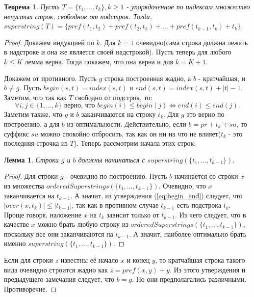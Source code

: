 \documentclass[a4paper,10pt]{article}
\newtheorem{theorem}{Теорема}
\newtheorem{lemma}{Лемма}
\begin{document}
\begin{theorem}
Пусть $T = \{t_1,\dots,t_k\}, k \geq 1$ - упорядоченное по индексам множество непустых строк, свободное от подстрок.
Тогда, $superstring(T) = \{ pref(t_1, t_2)+pref(t_2, t_3)+\dots+pref(t_{k-1}, t_k)+t_k\}$. 
\end{theorem}

\begin{proof}
Докажем индукцией по $k$.
Для $k = 1$ очевидно(сама строка должна лежать в надстроке и она же является своей надстрокой).
Пусть теперь для любого $k \leq K$ лемма верна. Тогда покажем, что она верна и для $k = K + 1$.

Докажем от противного. Пусть $g$ строка построенная жадно, а $b$ - кратчайшая, и $b \ne g$.
Пусть $begin(s, t) = index(s, t)$ и $end(s, t) = index(s, t) + |t| - 1$.
Заметим, что так как $T$ свободно от подстрок, то:
\begin{equation} \label{eq:begin_end}
	 \forall i,j \in \{ 1, \dots, k \} \mbox{ верно, что } begin(i) \leq begin(j) \iff end(i) \leq end(j).
\end{equation}
Заметим также, что $g$ и $b$ заканчиваются на строку $t_k$. Для $g$ это верно по построению, а для $b$ из оптимальности. 
Действительно, если $b = pr + t_k + su$, то суффикс $su$ можно спокойно отбросить, так как он ни на что не влияет($t_k$ - это последняя строчка из $T$).
Теперь рассмотрим начала этих строк:

\begin{lemma}
Строки $g$ и $b$ должны начинаться с $superstring(\{ t_1, \dots, t_{k-1} \})$.
\end{lemma}

\begin{proof}
Для строки $g$ - очевидно по построению.
Пусть $b$ начинается со строки $x$ из множества $orderedSuperstrings(\{ t_1, \dots, t_{k-1} \})$.
Очевидно, что $x$ заканчивается на $t_{k-1}$.
А значит, из утверждения (\ref{eq:begin_end}) следует, что $|over(x, t_k)| \leq |t_{k-1}|$, так как в противном случае $t_{k-1}$ есть подстрока $t_k$.
Проще говоря, наложение $x$ на $t_k$ зависит только от $t_{k-1}$.
Из чего следует, что в качестве $x$ можно брать любую строку из $orderedSuperstrings(\{ t_1, \dots, t_{k-1} \})$, поскольку все они заканчиваются на $t_{k-1}$.
А значит, наиболее оптимально брать именно $superstring(\{ t_1, \dots, t_{k-1} \})$.
\end{proof}

Если для строки $z$ известны её начало $x$ и конец $y$, то кратчайшая строка такого вида очевидно строится жадно как $z = pref(x, y) + y$.
Из этого утверждения и предыдущего замечания следует, что $b = g$. Но они предполагались различными. Противоречие.
\end{proof}
\end{document}
